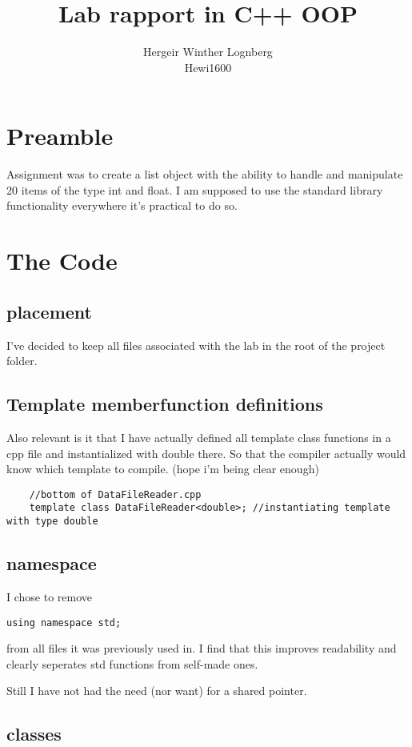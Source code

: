\documentclass[11pt]{article}
\title{\textbf{Lab rapport in C++ OOP}}
\author{Hergeir Winther Lognberg \\
Hewi1600}
\date{}
\begin{document}
\maketitle

\section{Preamble}

Assignment was to create a list object with the ability to handle and manipulate 20 items of the type int and float. I am supposed to use the standard library functionality everywhere it's practical to do so.
\section{The Code}
\subsection{placement}
I've decided to keep all files associated with the lab in the root of the project folder.
\subsection{Template memberfunction definitions}
Also relevant is it that I have actually defined all template class functions in a cpp file and instantialized with double there. So that the compiler actually would know which template to compile. (hope i'm being clear enough)

\begin{lstlisting}
	//bottom of DataFileReader.cpp
	template class DataFileReader<double>; //instantiating template with type double
\end{lstlisting}

\subsection{namespace}
I chose to remove
\begin{lstlisting}
using namespace std;
\end{lstlisting}
from all files it was previously used in. I find that this improves readability and clearly seperates std functions from self-made ones.


Still I have not had the need (nor want) for a shared pointer. 

\subsection{classes}
\end{document}
